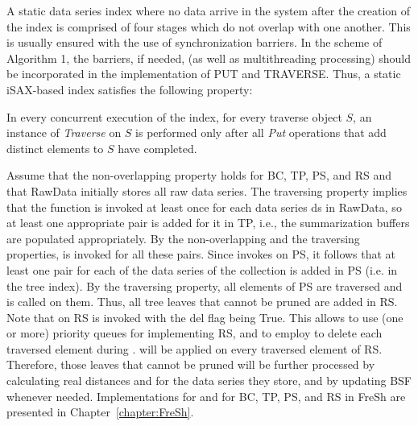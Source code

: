 A static data series index where no data arrive in the system after the creation of the
index is comprised of four stages which do not overlap with one another. This is
usually ensured with the use of synchronization barriers. In the scheme of Algorithm 1,
the barriers, if needed, (as well as multithreading processing) should be incorporated
in the implementation of PUT and TRAVERSE. Thus, a static iSAX-based
index satisfies the following property:
% 
\begin{definition}
    \label{def:non-overlapping}
    In every concurrent execution of the index, for every traverse object $S$, an
    instance of \textit{Traverse} on $S$ is performed only after all \textit{Put}
    operations that add distinct elements to $S$ have completed.
\end{definition}
% 
Assume that the non-overlapping property holds for BC, TP, PS, and RS and that RawData
initially stores all raw data series. The traversing property implies that the
\textit{\BufferCreation} function is invoked at least once for each data series ds in RawData, so
at least one appropriate pair is added for it in TP, i.e., the summarization buffers
are populated appropriately. By the non-overlapping and the traversing properties,
\textit{\BufferCreation} is invoked for all these pairs. Since \textit{\BufferCreation}
invokes \textit{\Put} on PS, it follows that at least one pair for each of the data series of the collection
is added in PS (i.e. in the tree index). By the traversing property, all elements of PS
are traversed and \textit{\Prunning} is called on them. Thus, all tree leaves that cannot be
pruned are added in RS. Note that \textit{\Traverse} on RS is invoked with the del flag being True.
This allows to use (one or more) priority queues for implementing RS, and to employ
\textit{\DeleteMin} to delete each traversed element during \textit{\Traverse}. \textit{\Refinement}
will be applied on every traversed element of RS. Therefore, those leaves that cannot be pruned
will be further processed by calculating real distances and for the data series they store,
and by updating BSF whenever needed. Implementations for \textit{\Put} and \textit{\Traverse} for BC, TP,
PS, and RS in FreSh are presented in Chapter~\ref{chapter:FreSh}.


